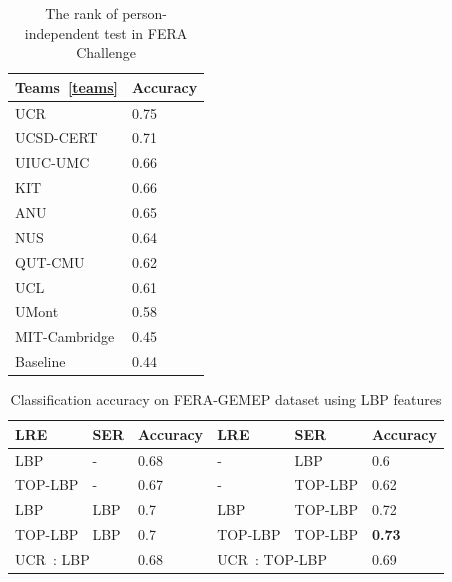 \documentclass[journal]{IEEEtran}
\begin{document}
\begin{table}
\caption{The rank of person-independent test in FERA Challenge\label{table:fera_team}}
\centering
\begin{tabular}{ll}
\toprule
	Teams~\ref{teams} & Accuracy \\ \midrule
	UCR 								& 0.75 \\ 
	UCSD-CERT						& 0.71 \\ 
	UIUC-UMC						& 0.66 \\ 
	KIT									& 0.66 \\ 
	ANU									& 0.65 \\ 
	NUS									& 0.64 \\ 
	QUT-CMU							& 0.62 \\ 
	UCL									& 0.61 \\ 
	UMont								& 0.58 \\ 
	MIT-Cambridge				& 0.45 \\ 
	Baseline						& 0.44 \\
\bottomrule
\end{tabular}
\end{table}



\begin{table}[!t]
\caption{Classification accuracy on FERA-GEMEP dataset using LBP features\label{table:comp_lbp}}
\centering
\scriptsize
\begin{tabular}{lll||lll}
\toprule
LRE & SER & Accuracy	& LRE	& SER	& Accuracy \\ \midrule 
LBP	& -		& 0.68	& - & LBP & 0.6 \\
TOP-LBP & - & 0.67 & - & TOP-LBP & 0.62 \\
LBP & LBP & 0.7 & LBP & TOP-LBP & 0.72 \\
TOP-LBP & LBP & 0.7 & TOP-LBP & TOP-LBP & \textbf{0.73} \\ \midrule
\multicolumn{2}{l}{UCR~\cite{Yang_SMCB12}: LBP} & 0.68 & \multicolumn{2}{l}{UCR~\cite{Yang_SMCB12}: TOP-LBP} & 0.69 \\
\bottomrule

\end{tabular}
\end{table}
\end{document}
